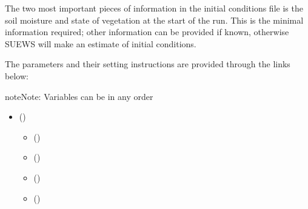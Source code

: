 \documentclass[letterpaper,10pt,english]{sphinxmanual}
\begin{document}
The two most important pieces of information in the initial conditions
file is the soil moisture and state of vegetation at the start of the
run. This is the minimal information required; other information can be
provided if known, otherwise SUEWS will make an estimate of initial
conditions.

The parameters and their setting instructions are provided through the links below:

\begin{sphinxadmonition}{note}{Note:}
Variables can be in any order
\end{sphinxadmonition}
\begin{itemize}
\item {} 
{\hyperref[\detokenize{input_files/Initial_Conditions/Soil_moisture_states:soil-moisture-states}]{}} ()
\begin{itemize}\setlength{\itemsep}{0pt}\setlength{\parskip}{0pt}
\item {} 
{\hyperref[\detokenize{input_files/Initial_Conditions/Soil_moisture_states:cmdoption-arg-soilstorepavedstate}]{}} ()

\item {} 
{\hyperref[\detokenize{input_files/Initial_Conditions/Soil_moisture_states:cmdoption-arg-soilstorebldgsstate}]{}} ()

\item {} 
{\hyperref[\detokenize{input_files/Initial_Conditions/Soil_moisture_states:cmdoption-arg-soilstoreevetrstate}]{}} ()

\item {} 
{\hyperref[\detokenize{input_files/Initial_Conditions/Soil_moisture_states:cmdoption-arg-soilstoredectrstate}]{}} ()


\end{itemize}
\end{itemize}
\end{document}
